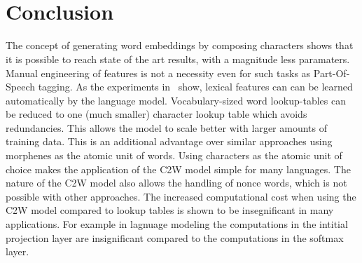 \documentclass[twoside,11pt,a4paper]{article}
\newcommand*{\Frac}[2]{\frac{\displaystyle #1}{\displaystyle #2}}
\theoremstyle{break}
\begin{document}
\newpage
\ 
\newpage

%
%
%
%
%
\pagestyle{headings}
\tableofcontents
\listoftables
\listoffigures
\newpage
\pagestyle{empty}
\ 
\newpage
\pagestyle{headings}

%
%
%
%










\section{Conclusion}

The concept of generating word embeddings by composing characters shows that it is possible to reach
state of the art results, with a magnitude less paramaters.
Manual engineering of features is not a necessity even for such tasks as Part-Of-Speech tagging.
As the experiments in~\cite{DBLP:journals/corr/LingLMAADBT15} show, lexical features can
can be learned automatically by the language model. Vocabulary-sized word lookup-tables
can be reduced to one (much smaller) character lookup table which avoids redundancies.
This allows the model to scale better with
larger amounts of training data. This is an additional advantage over similar approaches using 
morphenes as the atomic unit of words.
Using characters as the atomic unit of choice makes the application of the C2W model simple for many languages.
The nature of the C2W model also allows the handling of nonce words, which is not possible with other approaches.
The increased computational cost when using the C2W model compared to lookup tables is shown to be
insegnificant in many applications. For example in lagnuage modeling the computations in the intitial projection 
layer are insignificant compared to the computations in the softmax layer.
\end{document}
